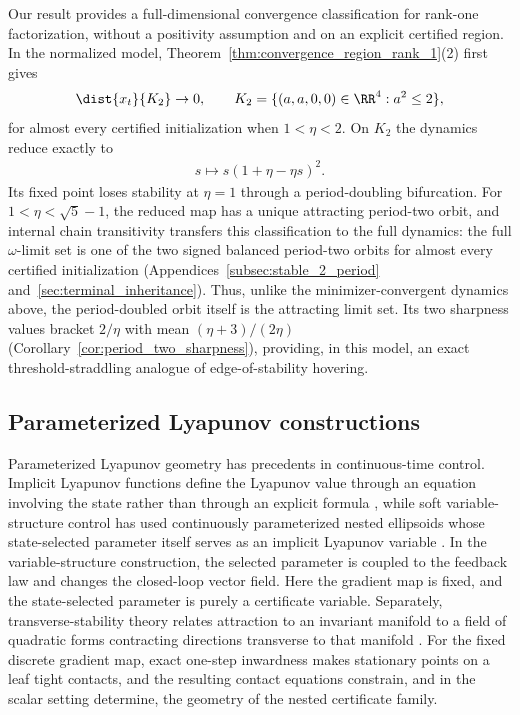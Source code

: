 \documentclass{article}
\begin{document}
Our result provides a full-dimensional convergence classification for rank-one
factorization, without a positivity assumption and on an explicit certified
region. In the normalized model,
Theorem~\ref{thm:convergence_region_rank_1}(2) first gives
\begin{align}
    \dist{x_t}{K_2}\to0,
    \qquad
    K_2=\{(a,a,0,0)\in\RR^4:a^2\le2\},
\end{align}
for almost every certified initialization when $1<\eta<2$. On $K_2$ the
dynamics reduce exactly to
\begin{align}
    s\longmapsto s(1+\eta-\eta s)^2.
\end{align}
Its fixed point loses stability at $\eta=1$ through a period-doubling
bifurcation. For $1<\eta<\sqrt5-1$, the reduced map has a unique attracting
period-two orbit, and internal chain transitivity transfers this classification
to the full dynamics: the full $\omega$-limit set is one of the two signed
balanced period-two orbits for almost every certified initialization
(Appendices~\ref{subsec:stable_2_period} and~\ref{sec:terminal_inheritance}).
Thus, unlike the minimizer-convergent dynamics above, the period-doubled orbit
itself is the attracting limit set. Its two sharpness values bracket $2/\eta$
with mean $(\eta+3)/(2\eta)$
(Corollary~\ref{cor:period_two_sharpness}), providing, in this model, an exact
threshold-straddling analogue of edge-of-stability hovering.

\subsection{Parameterized Lyapunov constructions}
\label{subsec:rw_lyapunov_construction}

Parameterized Lyapunov geometry has precedents in continuous-time control.
Implicit Lyapunov functions define the Lyapunov value through an equation
involving the state rather than through an explicit formula
\citep{adamy2005implicit}, while soft variable-structure control has used
continuously parameterized nested ellipsoids whose state-selected parameter
itself serves as an implicit Lyapunov variable
\citep{roethig2016stabilizing}. In the variable-structure construction, the
selected parameter is coupled to the feedback law and changes the closed-loop
vector field. Here the gradient map is fixed, and the state-selected parameter
is purely a certificate variable. Separately, transverse-stability theory relates
attraction to an invariant manifold to a field of quadratic forms contracting
directions transverse to that manifold \citep{andrieu2016transverse}. For the
fixed discrete gradient map, exact one-step inwardness makes stationary points
on a leaf tight contacts, and the resulting contact equations constrain, and
in the scalar setting determine, the geometry of the nested certificate family.
\end{document}
